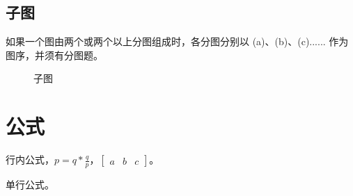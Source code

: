 \subsection{子图}
如果一个图由两个或两个以上分图组成时，各分图分别以 (a)、(b)、(c)...... 作为图序，并须有分图题。
\begin{figure}[H] %
	\centering  %
	\vspace{-0.35cm} %
	\subfigtopskip=2pt %
	\subfigbottomskip=2pt %
	\subfigcapskip=-5pt %
	\quad %
	\caption{子图}
	\label{level}
\end{figure}

\section{公式}

行内公式，$p = q * \frac{q}{p}$，$\begin{bmatrix} a & b & c \end{bmatrix}$。

单行公式。

